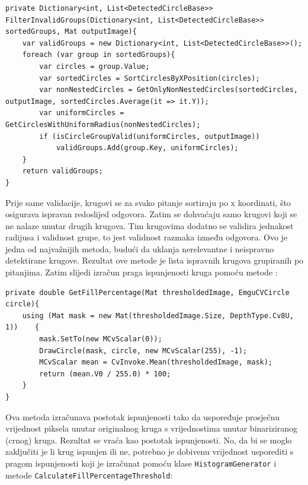 \documentclass{foi}
\begin{document}
\begin{lstlisting}[caption={Metoda za filtriranje neispravnih krugova i pitanja}]
private Dictionary<int, List<DetectedCircleBase>> FilterInvalidGroups(Dictionary<int, List<DetectedCircleBase>> sortedGroups, Mat outputImage){
    var validGroups = new Dictionary<int, List<DetectedCircleBase>>();
    foreach (var group in sortedGroups){
        var circles = group.Value;
        var sortedCircles = SortCirclesByXPosition(circles);
        var nonNestedCircles = GetOnlyNonNestedCircles(sortedCircles, outputImage, sortedCircles.Average(it => it.Y));
        var uniformCircles = GetCirclesWithUniformRadius(nonNestedCircles);
        if (isCircleGroupValid(uniformCircles, outputImage))
            validGroups.Add(group.Key, uniformCircles);
    }
    return validGroups;
}
\end{lstlisting}

Prije same validacije, krugovi se za svako pitanje sortiraju po x koordinati, što osigurava ispravan redoslijed odgovora. Zatim se dohvaćaju samo krugovi koji se ne nalaze unutar drugih krugova. Tim krugovima dodatno se validira jednakost radijusa i validnost grupe, to jest validnost razmaka između odgovora. Ovo je jedna od najvažnijih metoda, budući da uklanja nerelevantne i neispravno detektirane krugove. Rezultat ove metode je lista ispravnih krugova grupiranih po pitanjima. Zatim slijedi izračun praga ispunjenosti kruga pomoću metode \texttt{}:



\begin{lstlisting}[caption={Metoda za izračun postotka ispunjenosti kruga}]
private double GetFillPercentage(Mat thresholdedImage, EmguCVCircle circle){
    using (Mat mask = new Mat(thresholdedImage.Size, DepthType.Cv8U, 1))    {
        mask.SetTo(new MCvScalar(0));
        DrawCircle(mask, circle, new MCvScalar(255), -1);
        MCvScalar mean = CvInvoke.Mean(thresholdedImage, mask);
        return (mean.V0 / 255.0) * 100;
    }
}
\end{lstlisting}

Ova metoda izračunava postotak ispunjenosti tako da uspoređuje prosječnu vrijednost piksela unutar originalnog kruga s vrijednostima unutar binariziranog (crnog) kruga. Rezultat se vraća kao postotak ispunjenosti.
\pagebreak
No, da bi se moglo zaključiti je li krug ispunjen ili ne, potrebno je dobivenu vrijednost usporediti s pragom ispunjenosti koji je izračunat pomoću klase \texttt{HistogramGenerator} i metode \texttt{CalculateFillPercentageThreshold}:
\end{document}
